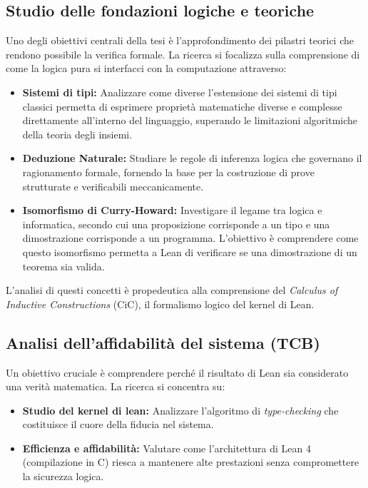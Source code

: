 \subsection{Studio delle fondazioni logiche e teoriche}
Uno degli obiettivi centrali della tesi è l'approfondimento dei pilastri teorici che rendono possibile la verifica formale. 
La ricerca si focalizza sulla comprensione di come la logica pura si interfacci con la computazione attraverso:
\begin{itemize}
    \item \textbf{Sistemi di tipi:} 
        Analizzare come diverse l'estensione dei sistemi di tipi classici permetta di esprimere 
        proprietà matematiche diverse e complesse direttamente all'interno del linguaggio, 
        superando le limitazioni algoritmiche della teoria degli insiemi.
    \item \textbf{Deduzione Naturale:} 
        Studiare le regole di inferenza logica che governano il ragionamento formale, 
        fornendo la base per la costruzione di prove strutturate e verificabili meccanicamente.
    \item \textbf{Isomorfismo di Curry-Howard:} 
        Investigare il legame tra logica e informatica, secondo cui una proposizione corrisponde a un tipo 
        e una dimostrazione corrisponde a un programma. L'obiettivo è comprendere come questo isomorfismo 
        permetta a Lean di verificare se una dimostrazione di un teorema sia valida.
\end{itemize}
L'analisi di questi concetti è propedeutica alla comprensione del \textit{Calculus of Inductive Constructions} (CiC), 
il formalismo logico del kernel di Lean.

\subsection{Analisi dell'affidabilità del sistema (TCB)}
Un obiettivo cruciale è comprendere perché il risultato di Lean sia considerato una verità matematica. La ricerca si concentra su:
\begin{itemize}
    \item \textbf{Studio del kernel di lean:} 
        Analizzare l'algoritmo di \textit{type-checking} che costituisce il cuore 
        della fiducia nel sistema.
    \item \textbf{Efficienza e affidabilità:} 
        Valutare come l'architettura di Lean 4 (compilazione in C) riesca a 
        mantenere alte prestazioni senza compromettere la sicurezza logica.
\end{itemize}

